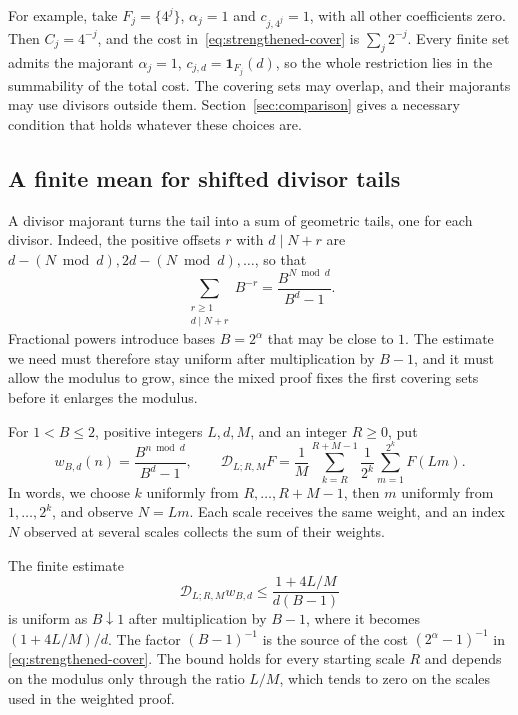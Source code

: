 \documentclass[11pt]{article}
\begin{document}
For example, take $F_j=\{4^j\}$, $\alpha_j=1$ and $c_{j,4^j}=1$,
with all other coefficients zero. Then $C_j=4^{-j}$, and the cost
in~\eqref{eq:strengthened-cover} is $\sum_j2^{-j}$. Every finite set
admits the majorant $\alpha_j=1$, $c_{j,d}=\mathbf1_{F_j}(d)$, so the
whole restriction lies in the summability of the total cost. The
covering sets may overlap, and their majorants may use divisors outside
them. Section~\ref{sec:comparison} gives a necessary condition that
holds whatever these choices are.

\subsection{A finite mean for shifted divisor tails}
A divisor majorant turns the tail into a sum of geometric tails, one
for each divisor. Indeed, the positive offsets $r$ with $d\mid N+r$ are
$d-(N\bmod d),2d-(N\bmod d),\ldots$, so that
\[
 \sum_{\substack{r\ge1\\d\mid N+r}}B^{-r}
 =\frac{B^{N\bmod d}}{B^d-1}.
\]
Fractional powers introduce bases $B=2^\alpha$ that may be close to
$1$. The estimate we need must therefore stay uniform after
multiplication by $B-1$, and it must allow the modulus to grow, since
the mixed proof fixes the first covering sets before it enlarges the
modulus.

For $1<B\le2$, positive integers $L,d,M$, and an integer $R\ge0$, put
\[
 w_{B,d}(n)=\frac{B^{n\bmod d}}{B^d-1},\qquad
 \mathscr D_{L;R,M}F
 =\frac1M\sum_{k=R}^{R+M-1}\frac1{2^k}
      \sum_{m=1}^{2^k}F(Lm).
\]
In words, we choose $k$ uniformly from $R,\ldots,R+M-1$, then $m$
uniformly from $1,\ldots,2^k$, and observe $N=Lm$. Each scale receives
the same weight, and an index $N$ observed at several scales collects
the sum of their weights.

The finite estimate
\begin{equation*}
 \mathscr D_{L;R,M}w_{B,d}
 \le\frac{1+4L/M}{d(B-1)}
 \tag{S}\label{eq:mixed-finite-kernel}
\end{equation*}
is uniform as $B\downarrow1$ after multiplication by $B-1$, where it
becomes $(1+4L/M)/d$. The factor $(B-1)^{-1}$ is the source of the
cost $(2^\alpha-1)^{-1}$ in \eqref{eq:strengthened-cover}. The bound
holds for every starting scale $R$ and depends on the modulus only
through the ratio $L/M$, which tends to zero on the scales used in the
weighted proof.
\end{document}

